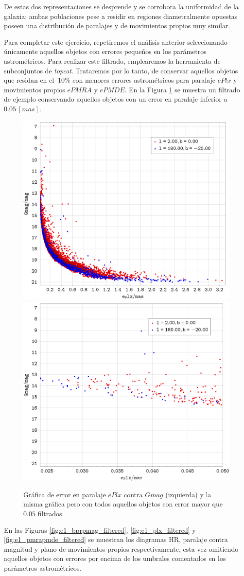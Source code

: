 \documentclass[a4paper,fleqn,usenatbib]{mnras}
\begin{document}
\newpage

De estas dos representaciones se desprende y se corrobora la uniformidad de la galaxia: ambas poblaciones pese a residir en regiones diametralmente opuestas poseen una distribución de paralajes y de movimientos propios muy similar.

Para completar este ejercicio, repetiremos el análisis anterior seleccionando únicamente aquellos objetos con errores pequeños en los parámetros astrométricos. Para realizar este filtrado, emplearemos la herramienta de subconjuntos de \emph{topcat}. Trataremos por lo tanto, de conservar aquellos objetos que residan en el $~10\%$ con menores errores astrométricos para paralaje $ePlx$ y movimientos propios $ePMRA$ y $ePMDE$. En la Figura \ref{fig:e1_eplx} se muestra un filtrado de ejemplo conservando aquellos objetos con un error en paralaje inferior a $0.05~[mas]$.

\begin{figure}
  \includegraphics[width=0.49\linewidth]{img/ejercicio1_eplx}
  \includegraphics[width=0.49\linewidth]{img/ejercicio1_eplx_filtered}
  \caption{Gráfica de error en paralaje $ePlx$ contra $Gmag$ (izquierda) y la misma gráfica pero con todos aquellos objetos con error mayor que $0.05$ filtrados.}
  \label{fig:e1_eplx}
\end{figure}

En las Figuras \ref{fig:e1_bprpmag_filtered}, \ref{fig:e1_plx_filtered} y \ref{fig:e1_pmrapmde_filtered} se muestran los diagramas HR, paralaje contra magnitud y plano de movimientos propios respectivamente, esta vez omitiendo aquellos objetos con errores por encima de los umbrales comentados en los parámetros astrométricos.
\end{document}

